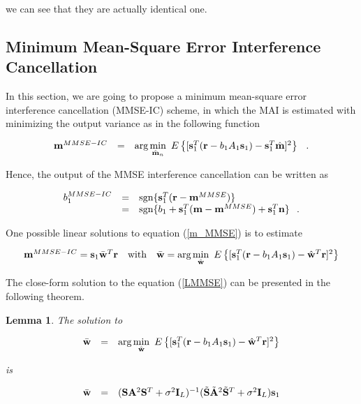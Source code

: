 \documentclass[a4paper,12pt,fleqn]{article}
\newtheorem{lemma}{Lemma}
\newcommand{\br}{{\mathbf r}}
\newcommand{\bA}{{\mathbf A}}
\newcommand{\bs}{{\bf s}}
\newcommand{\bn}{{\bf n}}
\newcommand{\bm}{{\bf m}}
\newcommand{\bw}{{\bf w}}
\newcommand{\bS}{{\bf S}}
\newcommand{\bI}{{\bf I}}
\begin{document}
\noindent we can see that they are actually identical one.

\subsection{Minimum Mean-Square Error Interference Cancellation}

In this section, we are going to propose a minimum mean-square
error interference cancellation (MMSE-IC) scheme, in which the MAI
is estimated with minimizing the output variance as in the
following function

\begin{equation}
\begin{array}{rcl}
\bm^{MMSE-IC}&=&\mbox{arg}\min\limits_{\hat{\bm}_{n}}\
E\left\{[\bs_1^T(\br-b_1A_1\bs_1)-\bs_1^T\hat{\bm}]^2\right\}
\hspace{0.1in}.
\end{array}\label{m_MMSE}
\end{equation}

Hence, the output of the MMSE interference cancellation can be
written as

\begin{equation}
\begin{array}{rcl}
b_1^{MMSE-IC}&=&\mbox{sgn}\{\bs_1^T(\br-\bm^{MMSE})\}\\
&=&\mbox{sgn}\{b_1+\bs_1^T(\bm-\bm^{MMSE})+\bs_1^T\bn\}\hspace{0.1in}.
\end{array}
\end{equation}

One possible linear solutions to equation (\ref{m_MMSE}) is to
estimate

\begin{equation}
\begin{array}{rcl}
\bm^{MMSE-IC}=\bs_1\bar\bw^T\br&\mbox{with}&\bar\bw=\mbox{arg}\min\limits_{\hat\bw}\
E\left\{[\bs_1^T(\br-b_1A_1\bs_1)-\hat\bw^T\br]^2\right\}
\end{array}\label{LMMSE}
\end{equation}

The close-form solution to the equation (\ref{LMMSE}) can be
presented in the following theorem.

\begin{lemma} The solution to

\begin{equation}
\begin{array}{rcl}
\bar\bw&=&\mbox{arg}\min\limits_{\hat\bw}\
E\left\{[\bs_1^T(\br-b_1A_1\bs_1)-\hat\bw^T\br]^2\right\}
\end{array}
\end{equation}

\noindent is

\begin{equation}
\begin{array}{rcl}
\bar\bw&=&(\bS\bA^2\bS^T+\sigma^2\bI_L)^{-1}(\tilde{\bS}\tilde{\bA}^2\tilde{\bS}^T+\sigma^2\bI_L)\bs_1
\end{array}
\end{equation}

\end{lemma}
\end{document}
